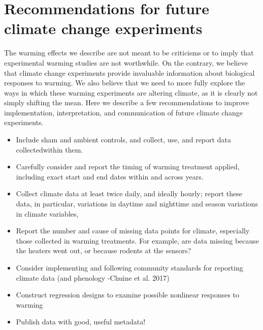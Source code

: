 \documentclass{article}
\begin{document}
\section {Recommendations for future climate change experiments}
\par The warming effects we describe are not meant to be criticisms or to imply that experimental warming studies are not worthwhile. On the contrary, we believe that climate change experiments provide invaluable information about biological responses to warming. We also believe that we need to more fully explore the ways in which these warming experiments are altering climate, as it is clearly not simply shifting the mean. Here we describe a few recommendations to improve implementation, interpretation, and communication of future climate change experiments.
\begin{itemize}
\item Include sham and ambient controls, and collect, use, and report data collectedwithin them.
\item Carefully consider and report the timing of warming treatment applied,
including exact start and end dates within and across years.
\item Collect climate data at least twice daily, and ideally hourly; report these
data, in particular, variations in daytime and nighttime and season variations
in climate variables,
\item Report the number and cause of missing data points for climate, especially
those collected in warming treatments. For example, are data missing
because the heaters went out, or because rodents at the sensors?
\item Consider implementing and following community standards for reporting
climate data (and phenology -Chuine et al. 2017)
\item Construct regression designs to examine possible nonlinear responses to
warming
\item Publish data with good, useful metadata!
\end{itemize}
\end{document}
